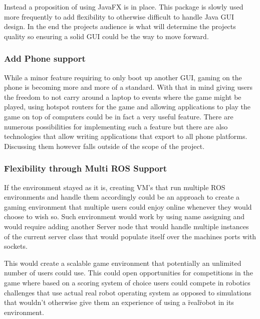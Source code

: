 \documentclass{report}
\begin{document}
        Instead a proposition of using JavaFX is in place. This package is slowly used more frequently to add flexibility to otherwise difficult to handle Java GUI design. In the end the projects audience is what will determine the projects quality so ensuring a solid GUI could be the way to move forward.

      \subsubsection{Add Phone support}
        While a minor feature requiring to only boot up another GUI, gaming on the phone is becoming more and more of a standard. With that in mind giving users the freedom to not carry around a laptop to events where the game might be played, using hotspot routers for the game and allowing applications to play the game on top of computers could be in fact a very useful feature. There are numerous possibilities for implementing such a feature but there are also technologies that allow writing applications that export to all phone platforms. Discussing them however falls outside of the scope of the project.

      \subsubsection{Flexibility through Multi ROS Support}
        If the environment stayed as it is, creating VM's that run multiple ROS environments and handle them accordingly could be an approach to create a gaming environment that multiple users could enjoy online whenever they would choose to wish so. Such environment would work by using name assigning and would require adding another Server node that would handle multiple instances of the current server class that would populate itself over the machines ports with sockets. 

        This would create a scalable game environment that potentially an unlimited number of users could use. This could open opportunities for competitions in the game where based on a scoring system of choice users could compete in robotics challenges that use actual real robot operating system as opposed to simulations that wouldn't otherwise give them an experience of using a \"real\" robot in its environment.
      
\end{document}
